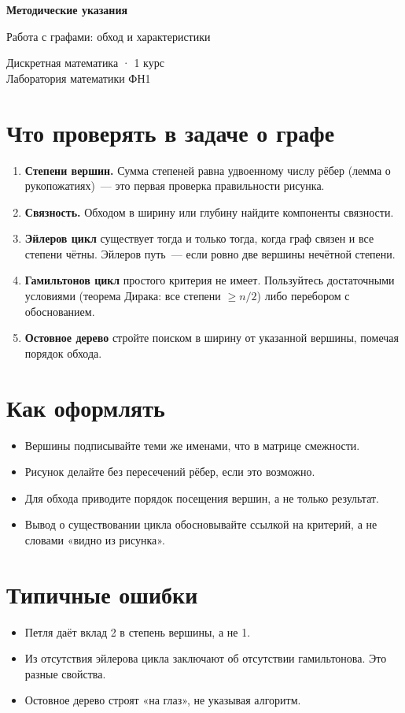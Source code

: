 \documentclass[12pt, a4paper]{article}
\begin{document}
\begin{center}
  {\large\bfseries Методические указания}

  \vspace{0.3em}
  {\large Работа с графами: обход и характеристики}

  \vspace{0.5em}
  {\small Дискретная математика · 1 курс\\ Лаборатория математики ФН1}
\end{center}
\vspace{1em}

\section*{Что проверять в задаче о графе}

\begin{enumerate}[nosep]
  \item \textbf{Степени вершин.} Сумма степеней равна удвоенному числу рёбер
        (лемма о рукопожатиях)~--- это первая проверка правильности рисунка.
  \item \textbf{Связность.} Обходом в ширину или глубину найдите компоненты связности.
  \item \textbf{Эйлеров цикл} существует тогда и только тогда, когда граф связен
        и все степени чётны. Эйлеров путь~--- если ровно две вершины нечётной степени.
  \item \textbf{Гамильтонов цикл} простого критерия не имеет. Пользуйтесь достаточными
        условиями (теорема Дирака: все степени $\ge n/2$) либо перебором с обоснованием.
  \item \textbf{Остовное дерево} стройте поиском в ширину от указанной вершины,
        помечая порядок обхода.
\end{enumerate}

\section*{Как оформлять}

\begin{itemize}[nosep]
  \item Вершины подписывайте теми же именами, что в матрице смежности.
  \item Рисунок делайте без пересечений рёбер, если это возможно.
  \item Для обхода приводите порядок посещения вершин, а не только результат.
  \item Вывод о существовании цикла обосновывайте ссылкой на критерий,
        а не словами «видно из рисунка».
\end{itemize}

\section*{Типичные ошибки}

\begin{itemize}[nosep]
  \item Петля даёт вклад 2 в степень вершины, а не 1.
  \item Из отсутствия эйлерова цикла заключают об отсутствии гамильтонова. Это разные свойства.
  \item Остовное дерево строят «на глаз», не указывая алгоритм.
\end{itemize}
\end{document}
